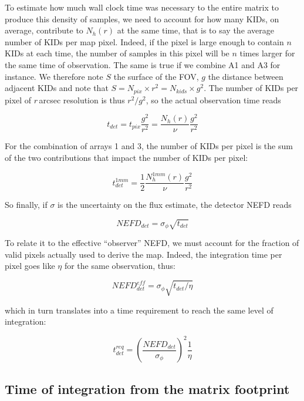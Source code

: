 To estimate how much wall clock time was necessary to the entire matrix to
produce this density of samples, we need to account for how many KIDs, on
average, contribute to $N_h(r)$ at the same time, that is to say the average
number of KIDs per map pixel. Indeed, if the pixel is large enough to contain
$n$ KIDs at each time, the number of samples in this pixel will be $n$ times
larger for the same time of observation. The same is true if we combine A1 and
A3 for instance. We therefore note $S$ the surface of the FOV, $g$ the distance
between adjacent KIDs and note that $S = N_{pix} \times r^2 = N_{kids} \times
g^2$. The number of KIDs per pixel of $r$\,arcsec resolution is thus $r^2/g^2$,
so the actual observation time reads

\begin{equation}
t_{det} = t_{pix}\frac{g^2}{r^2} = \frac{N_h(r)}{\nu}\frac{g^2}{r^2}
\end{equation}

For the combination of arrays 1 and 3, the number of KIDs per pixel is the sum
of the two contributions that impact the number of KIDs per pixel:

\begin{equation}
t_{det}^{1mm} = \frac{1}{2}\frac{N^{1mm}_h(r)}{\nu}\frac{g^2}{r^2}
\end{equation}

So finally, if $\sigma$ is the uncertainty on the flux estimate, the detector NEFD reads

\begin{equation}
NEFD_{det} = \sigma_\phi\sqrt{t_{det}}
\label{eq:nefd_t_int}
\end{equation}

To relate it to the effective ``observer'' NEFD, we must account for the
fraction of valid pixels actually used to derive the map. Indeed, the
integration time per pixel goes like $\eta$ for the same observation, thus:

\begin{equation}
NEFD_{det}^{eff} = \sigma_\phi\sqrt{t_{det}/\eta}
\end{equation}

which in turn translates into a time requirement to reach the same level of integration:

\begin{equation}
t_{det}^{req} = \left(\frac{NEFD_{det}}{\sigma_\phi}\right)^2\frac{1}{\eta}
\label{eq:t_astro}
\end{equation}

\subsection{Time of integration from the matrix footprint}

